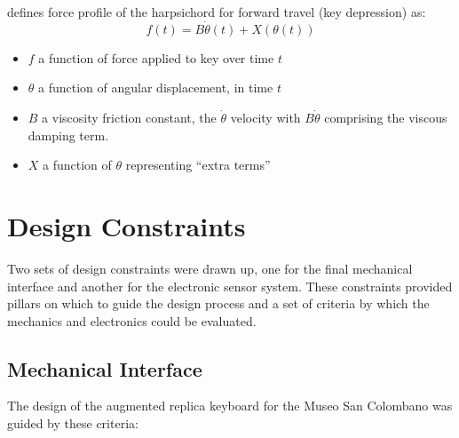 
\textcite{oboe_mikey_2006} defines force profile of the harpsichord for forward travel (key depression) as:
\begin{equation}
f(t) = B\dot{\theta}(t) + X(\theta(t))
\end{equation}

\begin{itemize}
    \item \(f\) a function of force applied to key over time \(t\)
    \item \(\theta\) a function of angular displacement, in time \(t\)
    \item \(B\) a viscosity friction constant, the \(\dot{\theta}\) velocity with \(B \dot{\theta}\) comprising the viscous damping term.
    \item \(X\) a function of \(\theta\) representing ``extra terms''
\end{itemize}

\section{Design Constraints}\label{sec:design-constraints}

Two sets of design constraints were drawn up, one for the final mechanical interface and another for the
electronic sensor system. These constraints provided pillars on which to guide the design process and a set of criteria by which the mechanics and electronics could be evaluated.

\subsection{Mechanical Interface}

The design of the augmented replica keyboard for the Museo San Colombano was guided by these criteria:

